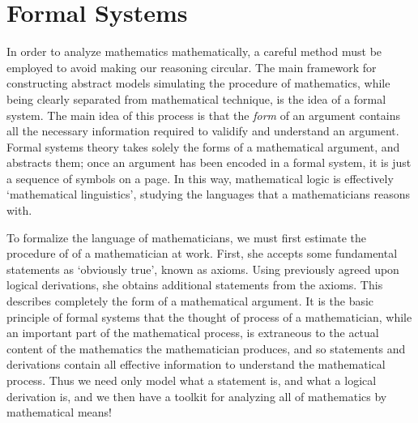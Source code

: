 \section{Formal Systems}

In order to analyze mathematics mathematically, a careful method must be employed to avoid making our reasoning circular. The main framework for constructing abstract models simulating the procedure of mathematics, while being clearly separated from mathematical technique, is the idea of a formal system. The main idea of this process is that the {\it form} of an argument contains all the necessary information required to validify and understand an argument. Formal systems theory takes solely the forms of a mathematical argument, and abstracts them; once an argument has been encoded in a formal system, it is just a sequence of symbols on a page. In this way, mathematical logic is effectively `mathematical linguistics', studying the languages that a mathematicians reasons with.

To formalize the language of mathematicians, we must first estimate the procedure of of a mathematician at work. First, she accepts some fundamental statements as `obviously true', known as axioms. Using previously agreed upon logical derivations, she obtains additional statements from the axioms. This describes completely the form of a mathematical argument. It is the basic principle of formal systems that the thought of process of a mathematician, while an important part of the mathematical process, is extraneous to the actual content of the mathematics the mathematician produces, and so statements and derivations contain all effective information to understand the mathematical process. Thus we need only model what a statement is, and what a logical derivation is, and we then have a toolkit for analyzing all of mathematics by mathematical means!


